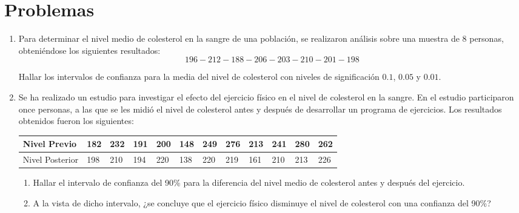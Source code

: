 \documentclass[a4paper]{article}
\begin{document}
\section*{Problemas}
\begin{enumerate}[leftmargin=*]
\item  Para determinar el nivel medio de colesterol en la sangre
de una población, se realizaron análisis sobre una muestra
de 8 personas, obteniéndose los siguientes resultados:
\[
196-212-188-206-203-210-201-198
\]

Hallar los intervalos de confianza para la media del nivel de
colesterol con niveles de significación $0.1$, $0.05$ y $0.01$.

\item  Se ha realizado un estudio para investigar el efecto del
ejercicio físico en el nivel de colesterol en la sangre. En el
estudio participaron once personas, a las que se les midió el
nivel de colesterol antes y después de desarrollar un programa
de ejercicios. Los resultados obtenidos fueron los siguientes:
\begin{center}
\begin{tabular}{|l|l|l|l|l|l|l|l|l|l|l|l|}
\hline
Nivel Previo & 182 & 232 & 191 & 200 & 148 & 249 & 276 & 213 & 241 & 280 & 262 \\
\hline
Nivel Posterior & 198 & 210 & 194 & 220 & 138 & 220 & 219 & 161 & 210 & 213 & 226 \\
\hline
\end{tabular}
\end{center}

\begin{enumerate}

\item Hallar el intervalo de confianza del 90\% para la
diferencia del nivel medio de colesterol antes y después del
ejercicio.

\item A la vista de dicho intervalo, ¿se concluye que el ejercicio
físico disminuye el nivel de colesterol con una confianza del 90\%?

\end {enumerate}


\end{enumerate}
\end{document}
